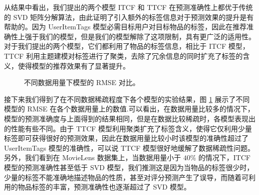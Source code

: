 从结果中看出，我们提出的两个模型 ITCF 和 TTCF 在预测准确性上都优于传统的 SVD 矩阵分解算法，由此证明了引入额外的标签信息对于预测效果的提升是有帮助的。因为 UserItemTags 模型必需目标用户对目标物品的标签，因此在推荐准确性上强于我们的模型，但是我们的模型解除了这项限制，具有更广泛的适用性。对于我们提出的两个模型，它们都利用了物品的标签信息，相比于 ITCF 模型，TTCF 利用主题建模对标签进行了聚类，去除了冗余信息的同时扩充了标签的含义，使得模型的推荐效果有了显著提升。
\begin{figure}[!htbp]
\centering
{}
\caption{不同数据用量下模型的 RMSE 对比。}
\label{fig:single_plot}
\end{figure}

接下来我们得到了在不同数据稀疏程度下各个模型的实验结果，图 \ref{fig:single_plot} 展示了不同模型的 RMSE 在各个数据用量上的数值.可以看出，在数据用量比较多的情况下，模型的预测准确度与上面得到的结果相同，但是在数据比较稀疏时，各模型表现出的性能有些不同。由于 TTCF 模型利用聚类扩充了标签含义，使得它仅利用少量标签即可获得很好的预测效果，因此在数据用量比较小时该模型的准确性超过了 UserItemTags 模型的准确性，可以说 TTCF 模型很好地缓解了数据稀疏性问题。另外，我们看到在 MovieLens 数据集上，当数据用量小于 $40\%$ 的情况下，ITCF 模型的预测准确性甚至低于 SVD 模型，我们推测这是因为当物品的标签很少时，少量的标签不能准确地描述物品的性质，甚至对评分预测产生了误导，而随着可利用的物品标签的丰富，预测准确性也逐渐超过了 SVD 模型。


